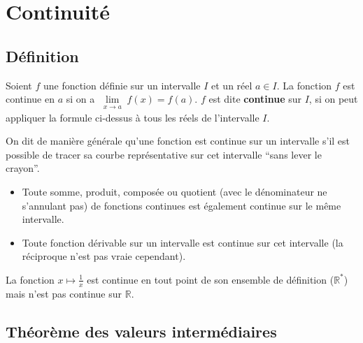 



	\section{Continuité}

	\subsection{Définition}

	\begin{formula}[Définition]
		Soient $f$ une fonction définie sur un intervalle $I$ et un réel $a \in I$. La fonction $f$ est continue en $a$ si on a $\lim\limits_{\substack{x \rightarrow a}} f(x) = f(a)$.
		\newpar
		$f$ est dite \textbf{continue} sur $I$, si on peut appliquer la formule ci-dessus à tous les réels de l'intervalle $I$.
	\end{formula}

	On dit de manière générale qu'une fonction est continue sur un intervalle s'il est possible de tracer sa courbe représentative sur cet intervalle ``sans lever le crayon''.

	\begin{formula}
		\begin{itemize}
			\item Toute somme, produit, composée ou quotient (avec le dénominateur ne s'annulant pas) de fonctions continues est également continue sur le même intervalle.
			\item Toute fonction dérivable sur un intervalle est continue sur cet intervalle (la réciproque n'est pas vraie cependant).
		\end{itemize}
	\end{formula}

	\begin{tip}[Exemple]
		La fonction $x \mapsto \frac{1}{x}$ est continue en tout point de son ensemble de définition ($\mathbb{R}^{*}$) mais n'est pas continue sur $\mathbb{R}$.
	\end{tip}

	\subsection{Théorème des valeurs intermédiaires}

